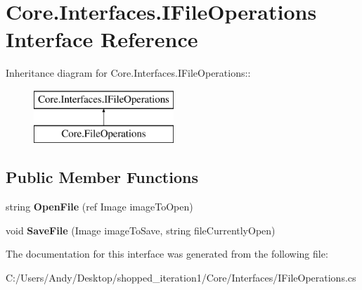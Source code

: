\hypertarget{interface_core_1_1_interfaces_1_1_i_file_operations}{
\section{Core.Interfaces.IFileOperations Interface Reference}
\label{interface_core_1_1_interfaces_1_1_i_file_operations}
}
Inheritance diagram for Core.Interfaces.IFileOperations::\begin{figure}[H]
\begin{center}
\leavevmode
\includegraphics[height=2cm]{interface_core_1_1_interfaces_1_1_i_file_operations}
\end{center}
\end{figure}
\subsection*{Public Member Functions}
\begin{DoxyCompactItemize}
\item 
\hypertarget{interface_core_1_1_interfaces_1_1_i_file_operations_ade0cc761d88f150a785da34cab42bff1}{
string {\bfseries OpenFile} (ref Image imageToOpen)}
\label{interface_core_1_1_interfaces_1_1_i_file_operations_ade0cc761d88f150a785da34cab42bff1}

\item 
\hypertarget{interface_core_1_1_interfaces_1_1_i_file_operations_a101249dec5f4ce71ab198ccf7f0b7f7f}{
void {\bfseries SaveFile} (Image imageToSave, string fileCurrentlyOpen)}
\label{interface_core_1_1_interfaces_1_1_i_file_operations_a101249dec5f4ce71ab198ccf7f0b7f7f}

\end{DoxyCompactItemize}


The documentation for this interface was generated from the following file:\begin{DoxyCompactItemize}
\item 
C:/Users/Andy/Desktop/shopped\_\-iteration1/Core/Interfaces/IFileOperations.cs\end{DoxyCompactItemize}

